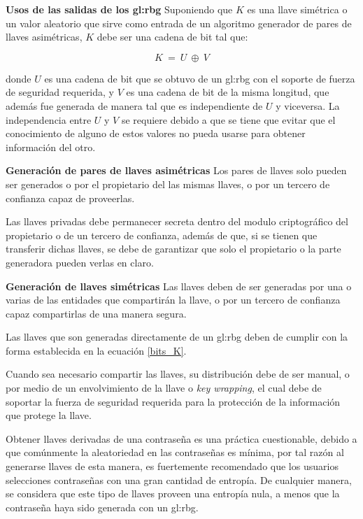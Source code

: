 \textbf{Usos de las salidas de los \gls{gl:rbg}}
Suponiendo que $K$ es una llave simétrica o un valor aleatorio que sirve 
como entrada de un algoritmo generador de pares de llaves asimétricas, $K$ 
debe ser una cadena de bit tal que: 

\begin{equation}
  \label{bits_K}
  K\: =\: U\: \oplus\: V
\end{equation}

donde $U$ es una cadena de bit que se obtuvo de un \gls{gl:rbg} con el 
soporte de fuerza de seguridad requerida, y $V$ es una cadena de bit de la 
misma longitud, que además fue generada de manera tal que es independiente de 
$U$ y viceversa. La independencia entre $U$ y $V$ se requiere debido a que se 
tiene que evitar que el conocimiento de alguno de estos valores no pueda 
usarse para obtener información del otro.

\textbf{Generación de pares de llaves asimétricas}
Los pares de llaves solo pueden ser generados o por el propietario del las 
mismas llaves, o por un tercero de confianza capaz de proveerlas.

Las llaves privadas debe permanecer secreta dentro del modulo criptográfico 
del propietario o de un tercero de confianza, además de que, si se tienen que 
transferir dichas llaves, se debe de garantizar que solo el propietario o la 
parte generadora pueden verlas en claro.

\textbf{Generación de llaves simétricas}
Las llaves deben de ser generadas por una o varias de las entidades que 
compartirán la llave, o por un tercero de confianza capaz compartirlas de una 
manera segura. 

Las llaves que son generadas directamente de un \gls{gl:rbg} deben de cumplir 
con la forma establecida en la ecuación \ref{bits_K}.

Cuando sea necesario compartir las llaves, su distribución debe de ser manual, 
o por medio de un envolvimiento de la llave o \textit{key wrapping}, el cual 
debe de soportar la fuerza de seguridad requerida para la protección de la 
información que protege la llave.

Obtener llaves derivadas de una contraseña es una práctica cuestionable, 
debido a que comúnmente la aleatoriedad en las contraseñas es mínima, por tal 
razón al generarse llaves de esta manera, es fuertemente recomendado que los 
usuarios selecciones contraseñas con una gran cantidad de entropía. De 
cualquier manera, se considera que este tipo de llaves proveen una entropía 
nula, a menos que la contraseña haya sido generada con un \gls{gl:rbg}.

